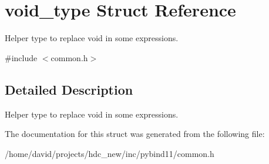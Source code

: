 \hypertarget{structvoid__type}{}\section{void\+\_\+type Struct Reference}
\label{structvoid__type}


Helper type to replace \textquotesingle{}void\textquotesingle{} in some expressions.  




{\ttfamily \#include $<$common.\+h$>$}



\subsection{Detailed Description}
Helper type to replace \textquotesingle{}void\textquotesingle{} in some expressions. 

The documentation for this struct was generated from the following file\+:\begin{DoxyCompactItemize}
\item 
/home/david/projects/hdc\+\_\+new/inc/pybind11/common.\+h\end{DoxyCompactItemize}
